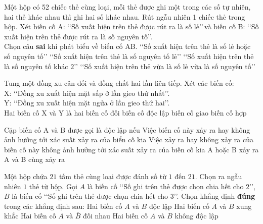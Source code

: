 \begin{ex}%
	Một hộp có 52 chiếc thẻ cùng loại, mỗi thẻ được ghi một trong các số tự nhiên, hai thẻ khác nhau thì ghi hai số khác nhau. Rút ngẫu nhiên 1 chiếc thẻ trong hộp. Xét biến cố A: \lq\lq Số xuất hiện trên thẻ được rút ra là số lẻ\rq\rq\,và biến cố B: \lq\lq Số xuất hiện trên  thẻ được rút ra là số nguyên tố\rq\rq.\\
	 Chọn câu \textbf{sai} khi phát biểu về biến cố AB.
	\choice 
		{\True \lq\lq Số xuất hiện trên thẻ là  số lẻ hoặc số nguyên tố\rq\rq}
		{\lq\lq Số xuất hiện trên  thẻ là số nguyên tố lẻ\rq\rq }
		{\lq\lq  Số xuất hiện trên thẻ là số nguyên tố khác $2$\rq\rq }
		{\lq\lq Số xuất  hiện trên thẻ vừa là số lẻ vừa là số nguyên tố\rq\rq}
\end{ex}

\begin{ex}%
	Tung  một đồng xu cân đối và đồng chất hai lần liên tiếp. Xét các biến cố:\\
	X:  \lq\lq Đồng xu xuất hiện mặt sấp ở lần gieo thứ nhất\rq\rq .\\
	Y: \lq\lq Đồng  xu xuất hiện mặt ngửa ở lần gieo thứ hai\rq\rq .\\
	Hai biến cố X  và Y là hai
	 \choice
		 {biến cố đối}
		{\True biến cố độc lập} 
		 {biến cố giao}
		{biến cố  hợp}
\end{ex}

\begin{ex}%
	Cặp biến cố A và B được gọi là  độc lập nếu
	 \choice
		{Việc biến cố này xảy ra hay không  ảnh hưởng tới xác suất xảy ra của biển cố kia}
		{\True Việc xảy ra hay không xảy ra của biến cố này không ảnh hưởng tới xác suất xảy ra của  biến cố kia}
		{A hoặc  B xảy ra}
		{A và B cùng  xảy ra}
\end{ex}

\begin{ex}%
	Một hộp chứa $21$ tấm thẻ cùng loại được đánh số từ $1$ đến $21$. Chọn ra ngẫu nhiên $1$ thẻ  từ hộp. Gọi $A$ là biến cố \lq\lq Số ghi trên thẻ được chọn chia hết cho $2$\rq\rq, $B$ là biến cố \lq\lq Số ghi trên thẻ được chọn chia hết cho $3$\rq\rq.
	Chọn khẳng định \textbf{đúng} trong các khẳng định  sau:
	 \choice
		{Hai biến cố $A$  và $B$ độc lập}
		{Hai biến cố $A$ và $B$  xung khắc}
		{Hai biến  cố $A$ và $\overline{B}$ đối nhau}
		{\True  Hai biến cố $A$ và $B$ không độc lập}
\end{ex}

